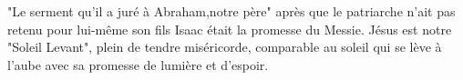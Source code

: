 "Le serment qu’il a juré à Abraham,notre père" après que le patriarche n'ait pas retenu pour lui-même son fils Isaac était la promesse du Messie. Jésus est notre "Soleil Levant", plein de tendre miséricorde, comparable au soleil qui se lève à l'aube avec sa promesse de lumière et d'espoir.

        
